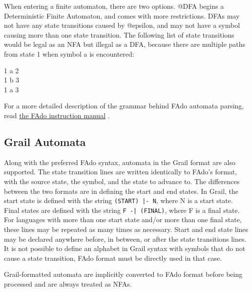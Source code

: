 \documentclass{article}
\begin{document}
\par When entering a finite automaton, there are two options.
@DFA begins a Deterministic Finite Automaton, and comes with more restrictions.
DFAs may not have any state transitions caused by @epsilon, and may not have a symbol causing more than one state transition.
The following list of state transitions would be legal as an NFA but illegal as a DFA, because there are multiple paths from state 1 when symbol a is encountered:
\begin{center}
1 a 2\\
1 b 3\\
1 a 3\\
\end{center}

\par For a more detailed description of the grammar behind FAdo automata parsing, read \href{https://www.dcc.fc.up.pt/~rvr/FAdo.pdf}{the FAdo instruction manual} \cite{FAdoManual}.

\subsection{Grail Automata}
Along with the preferred FAdo syntax, automata in the Grail\cite{Grail} format are also supported. 
The state transition lines are written identically to FAdo's format, with the source state, the symbol, and the state to advance to. 
The differences between the two formats are in defining the start and end states.
In Grail, the start state is defined with the string \verb=(START) |- N=, where N is a start state.
Final states are defined with the string \verb=F -| (FINAL)=, where F is a final state.
For languages with more than one start state and/or more than one final state, these lines may be repeated as many times as necessary.
Start and end state lines may be declared anywhere before, in between, or after the state transitions lines.
It is not possible to define an alphabet in Grail syntax with symbols that do not cause a state transition, FAdo format must be directly used in that case.

Grail-formatted automata are implicitly converted to FAdo format before being processed and are always treated as NFAs.
\end{document}
